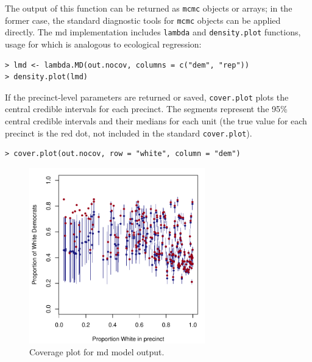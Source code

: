 \documentclass[12pt]{article}
\begin{document}
The output of this function can be returned as  \texttt{mcmc} objects
or arrays; in the former case, the standard diagnostic tools for
\texttt{mcmc} objects can be applied directly.   The {\sc md} implementation includes \texttt{lambda} and \texttt{density.plot}
functions, usage for which is analogous to ecological regression:

\begin{verbatim}
> lmd <- lambda.MD(out.nocov, columns = c("dem", "rep"))
> density.plot(lmd)
\end{verbatim}

If the precinct-level parameters are returned or saved,
\texttt{cover.plot} plots the central credible intervals for each
precinct.  The segments represent the 95\% central credible intervals
and their medians for each unit (the true value for each precinct is
the red dot, not included in the standard {\tt cover.plot}).

\begin{verbatim}
> cover.plot(out.nocov, row = "white", column = "dem")
\end{verbatim}
\begin{figure}[h]
\begin{center}
\includegraphics[width=3in]{coversmall.pdf}
\end{center}
\caption{Coverage plot for {\sc md} model output.}
\label{f:md}
\end{figure}
 
\end{document}
